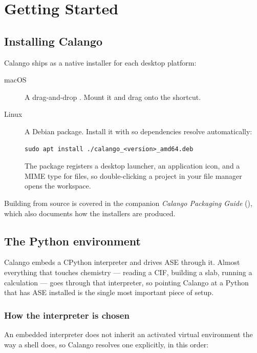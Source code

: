 \chapter{Getting Started}
\label{ch:getting-started}

\section{Installing Calango}

Calango ships as a native installer for each desktop platform:

\begin{description}
  \item[macOS] A drag-and-drop . Mount it and drag
     onto the  shortcut.
  \item[Linux] A Debian package. Install it with  so dependencies
    resolve automatically:
    \begin{lstlisting}
sudo apt install ./calango_<version>_amd64.deb
    \end{lstlisting}
    The package registers a desktop launcher, an application icon, and a
    MIME type for  files, so double-clicking a project in
    your file manager opens the workspace.
\end{description}

Building from source is covered in the companion \emph{Calango Packaging
Guide} (), which also documents how the installers
are produced.

\section{The Python environment}
\label{sec:python-env}

Calango embeds a CPython interpreter and drives ASE through it. Almost
everything that touches chemistry --- reading a CIF, building a slab,
running a calculation --- goes through that interpreter, so pointing
Calango at a Python that has ASE installed is the single most important
piece of setup.

\subsection{How the interpreter is chosen}

An embedded interpreter does not inherit an activated virtual environment
the way a shell does, so Calango resolves one explicitly, in this order:

